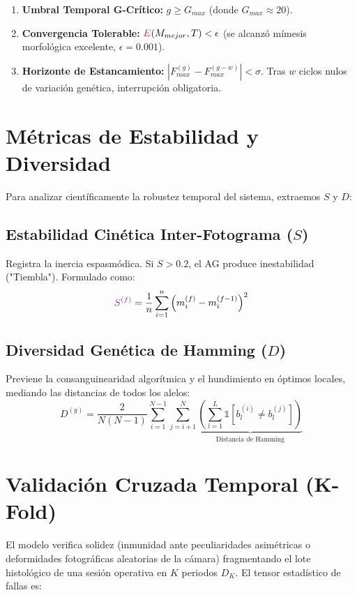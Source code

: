 \documentclass[11pt, a4paper]{article}
\begin{document}
\begin{enumerate}
    \item \textbf{Umbral Temporal G-Crítico:} $g \geq G_{max}$ (donde $G_{max} \approx 20$).
    \item \textbf{Convergencia Tolerable:} $\textcolor{corered}{E}(M_{mejor}, T) < \epsilon$ (se alcanzó mímesis morfológica excelente, $\epsilon = 0.001$).
    \item \textbf{Horizonte de Estancamiento:} $|F_{max}^{(g)} - F_{max}^{(g-w)}| < \sigma$. Tras $w$ ciclos nulos de variación genética, interrupción obligatoria.
\end{enumerate}


\section{Métricas de Estabilidad y Diversidad}

Para analizar científicamente la robustez temporal del sistema, extraemos $S$ y $D$:

\subsection{Estabilidad Cinética Inter-Fotograma ($S$)}
Registra la inercia espasmódica. Si $S > 0.2$, el AG produce inestabilidad ("Tiembla"). Formulado como:
\begin{equation}
\textcolor{corepurple}{S^{(f)}} = \frac{1}{n} \sum_{i=1}^{n} \Big( m_i^{(f)} - m_i^{(f-1)} \Big)^2
\end{equation}

\subsection{Diversidad Genética de Hamming ($D$)}
Previene la consanguinearidad algorítmica y el hundimiento en óptimos locales, mediando las distancias de todos los alelos:
\begin{equation}
D^{(g)} = \frac{2}{N(N-1)} \sum_{i=1}^{N-1} \sum_{j=i+1}^{N} \underbrace{\left( \sum_{l=1}^{L} \mathbb{1}[b_l^{(i)} \neq b_l^{(j)}] \right)}_{\text{Distancia de Hamming}}
\end{equation}


\section{Validación Cruzada Temporal (K-Fold)}

El modelo verifica solidez (inmunidad ante peculiaridades asimétricas o deformidades fotográficas aleatorias de la cámara) fragmentando el lote histológico de una sesión operativa en $K$ periodos $D_K$. El tensor estadístico de fallas es:
\end{document}
